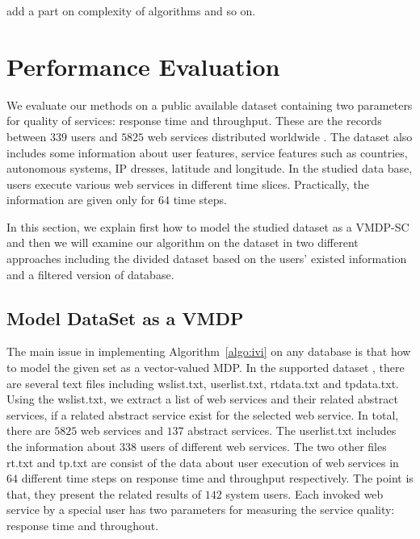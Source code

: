 \documentclass[10pt,journal,compsoc]{IEEEtran}
\begin{document}
{ \color{red}add a part on complexity of algorithms and so on.}

\section{Performance Evaluation}

We evaluate our methods on a public available dataset containing two parameters for quality of services: response time and throughput. These are the records between $339$ users and $5825$ web services distributed worldwide \cite{Zheng2014,Zheng2015}. The dataset also includes some information about user features, service features such as countries, autonomous systems, IP dresses, latitude and longitude. In the studied data base, users execute various web services in different time slices. Practically, the information are given only for $64$ time steps. 

In this section, we explain first how to model the studied dataset as a VMDP-SC and then we will examine our algorithm on the dataset in two different approaches including the divided dataset based on the users' existed information and  a filtered version of database. 

\subsection{Model DataSet as a VMDP}
The main issue in implementing Algorithm~\ref{algo:ivi} on any database is that how to model the given set as a vector-valued MDP. In the supported dataset \cite{Zheng2014,Zheng2015}, there are several text files including wslist.txt, userlist.txt, rtdata.txt and tpdata.txt. Using the wslist.txt, we extract a list of web services and their related abstract services, if a related abstract service exist for the selected web service. In total, there are $5825$ web services and $137$ abstract services. The userlist.txt includes the information about $338$ users of different web services. The two other files rt.txt and tp.txt are consist of the data about user execution of web services in $64$ different time steps on response time and throughput respectively. The point is that, they present the related results of $142$ system users. Each invoked web service by a special user has two parameters for measuring the service quality: response time and throughout. 
\end{document}
